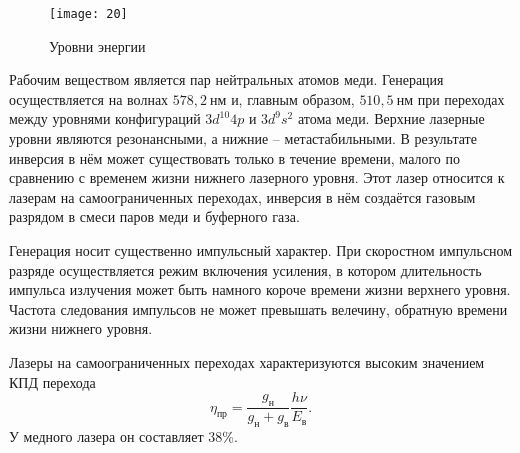 \begin{figure}[h]
    \center
    \texttt{[image: 20]}
    \caption{Уровни энергии}
\end{figure}
Рабочим веществом является пар нейтральных атомов меди. Генерация 
осуществляется на волнах \( 578,2~\text{нм} \) и, главным образом, 
\( 510,5~\text{нм} \) при переходах между уровнями конфигураций 
\( 3d^{10}4p \) и \( 3d^9s^2 \) атома меди. Верхние лазерные уровни 
 являются резонансными, а нижние  -- 
метастабильными. В результате инверсия в нём может существовать только в 
течение времени, малого по сравнению с временем жизни нижнего лазерного 
уровня. Этот лазер относится к лазерам на самоограниченных переходах, инверсия 
в нём создаётся газовым разрядом в смеси паров меди и буферного газа.

Генерация носит существенно импульсный характер. При скоростном импульсном 
разряде осуществляется режим включения усиления, в котором длительность 
импульса излучения может быть намного короче времени жизни верхнего уровня. 
Частота следования импульсов не может превышать велечину, обратную времени 
жизни нижнего уровня.

Лазеры на самоограниченных переходах характеризуются высоким значением КПД 
перехода
\[
	\eta_\text{пр} =
    	\frac{g_\text{н}}{g_\text{н}+g_\text{в}}\frac{h\nu}{E_\text{в}}.
\]
У медного лазера он составляет 38\%.